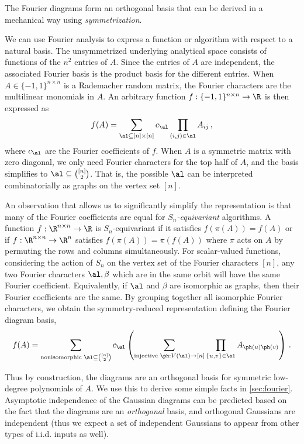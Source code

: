 \documentclass[12pt]{article}
\begin{document}
The Fourier diagrams form an orthogonal basis that can be derived in a mechanical way using \emph{symmetrization}.

We can use Fourier analysis to express a function or algorithm
with respect to a natural basis.
The unsymmetrized underlying analytical space consists of functions
of the $n^2$ entries of $A$.
Since the entries of $A$ are independent,
the associated Fourier basis is the product
basis for the different entries.
When $A \in \{-1, 1\}^{n \times n}$ is a Rademacher random matrix, the Fourier characters are the multilinear
monomials in $A$.
An arbitrary function $f:\{-1,1\}^{n\times n}\to \R$ is then expressed as
\[f(A) = \sum_{\al \subseteq [n] \times [n]} c_\al \prod_{(i,j) \in \al} A_{ij}\,,\]
where $c_\al$ are the Fourier coefficients of $f$.
When $A$ is a symmetric matrix with zero diagonal, we only need Fourier characters
for the top half of $A$, and the basis simplifies to $\al \subseteq \binom{[n]}{2}$.
That is, the possible $\al$ can be interpreted combinatorially as graphs on the vertex set $[n]$.


An observation that allows us to significantly simplify
the representation is that many of the Fourier coefficients are equal
for \emph{$S_n$-equivariant} algorithms. A function $f : \R^{n \times n} \to \R$ is $S_n$-equivariant if it satisfies $f(\pi(A)) = f(A)$ or if $f : \R^{n \times n} \to \R^n$ satisfies $f(\pi(A)) = \pi(f(A))$ where $\pi$ acts on $A$ by permuting the rows and columns simultaneously.
For scalar-valued functions, considering the action of $S_n$ on the vertex
set of the Fourier characters $[n]$, any two Fourier characters $\al, \beta$ which are in the same
orbit will have the same Fourier coefficient.
Equivalently, if $\al$ and $\beta$ are isomorphic as graphs,
then their Fourier coefficients are the same.
By grouping together all isomorphic Fourier characters, we obtain the symmetry-reduced representation
defining the Fourier diagram basis,
\[f(A) = \sum_{\text{nonisomorphic }\al \subseteq \binom{[n]}{2}} c_\al \left(\sum_{\substack{\text{injective }\ph: V(\al) \to [n]}} \prod_{\{u,v\} \in \al} A_{\ph(u)\ph(v)}\right)\,.\]


Thus by construction, the diagrams are an orthogonal
basis for symmetric low-degree polynomials of $A$. We use this to derive some simple facts in \cref{sec:fourier}.
Asymptotic independence of the Gaussian diagrams
can be predicted based on the fact that the diagrams
are an \emph{orthogonal} basis, and orthogonal Gaussians are independent
(thus we expect a set of independent Gaussians to appear from other types of i.i.d. inputs as well).
\end{document}
